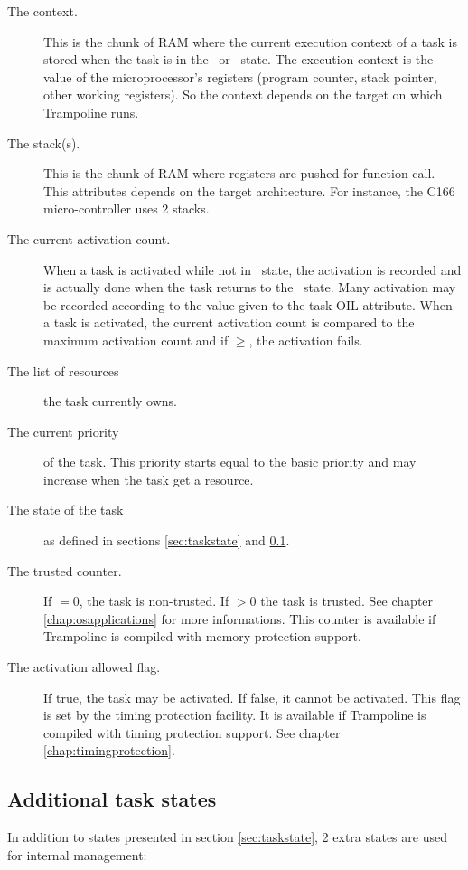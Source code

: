 \begin{description}
\item[The context.] This is the chunk of RAM where the current execution context of a task is stored when the task is in the \READY\ or \WAITING\ state. The execution context is the value of the microprocessor's registers (program counter, stack pointer, other working registers). So the context depends on the target on which Trampoline runs.
\item[The stack(s).] This is the chunk of RAM where registers are pushed for function call. This attributes depends on the target architecture. For instance, the C166 micro-controller uses 2 stacks.
\item[The current activation count.] When a task is activated while not in \SUSPENDED\ state, the activation is recorded and is actually done when the task returns to the \SUSPENDED\ state.  Many activation may be recorded according to the value given to the  task OIL attribute. When a task is activated, the current activation count is compared to the maximum activation count and if $\ge$, the activation fails.
\item[The list of resources] the task currently owns.
\item[The current priority] of the task. This priority starts equal to the basic priority and may increase when the task get a resource.
\item[The state of the task] as defined in sections \ref{sec:taskstate} and \ref{sec:internaltaskstate}.
\item[The trusted counter.] If $=0$, the task is non-trusted. If $>0$ the task is trusted. See chapter \ref{chap:osapplications} for more informations. This counter is available if Trampoline is compiled with memory protection support.
\item[The activation allowed flag.] If true, the task may be activated. If false, it cannot be activated. This flag is set by the timing protection facility. It is available if Trampoline is compiled with timing protection support. See chapter \ref{chap:timingprotection}.
\end{description}

\subsection{Additional task states}
\label{sec:internaltaskstate}

In addition to states presented in section \ref{sec:taskstate}, 2 extra states are used for internal management: 

